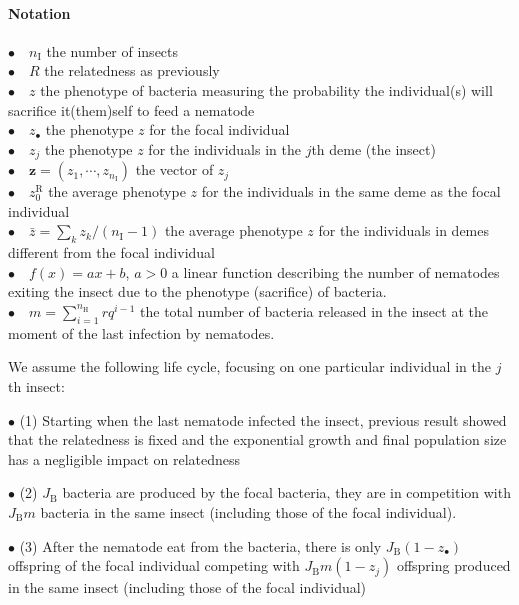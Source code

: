 \documentclass{article}
\newcommand{\nN}{{n_\textrm{H}}}
\newcommand{\nI}{{n_\textrm{I}}}
\begin{document}
  \paragraph{Notation} $ $\\
 $\bullet \quad \nI$ the number of insects \\
 $\bullet \quad R$ the relatedness as previously \\
 $\bullet \quad z$ the phenotype of bacteria measuring the probability the individual(s) will sacrifice it(them)self to feed a nematode\\
 $\bullet \quad z_\bullet $ the phenotype $z$ for the focal individual\\
 $\bullet \quad z_j$ the phenotype $z$ for the individuals in the $j$th deme (the insect)\\
 $\bullet \quad \mathbf{z}=(z_1,\cdots,z_{\nI})$ the vector of $z_j$\\
 $\bullet \quad z_0^{\mathrm{R}}$ the average phenotype $z$ for the individuals in the same deme as the focal individual\\
 $\bullet \quad \bar{z}=\sum_k z_k / (\nI -1) $ the average phenotype $z$ for the individuals in demes different from the focal individual\\
 $\bullet \quad f (x)=ax+b$, $a>0$ a linear function describing the number of nematodes exiting the insect due to the phenotype (sacrifice) of bacteria.\\
 $\bullet \quad m=\sum_{i=1}^\nN r q^{i-1}$ the total number of bacteria released in the insect at the moment of the last infection by nematodes.
 
 We assume the following life cycle, focusing on one particular individual in the $j$th insect:
 
 
 $\bullet$ (1) Starting when the last nematode infected the insect, previous result showed that the relatedness is fixed and the exponential growth and final population size has a negligible impact on relatedness
 
 
 $\bullet$ (2) $J_{\mathrm{B}}$ bacteria are produced by the focal bacteria, they are in competition with $J_{\mathrm{B}} m$ bacteria in the same insect (including those of the focal individual).
 
 
 $\bullet$ (3) After the nematode eat from the bacteria, there is only $J_{\mathrm{B}}(1-z_\bullet)$ offspring of the focal individual competing with $J_{\mathrm{B}} m (1-z_j)$ offspring produced in the same insect (including those of the focal individual)
 
\end{document}

